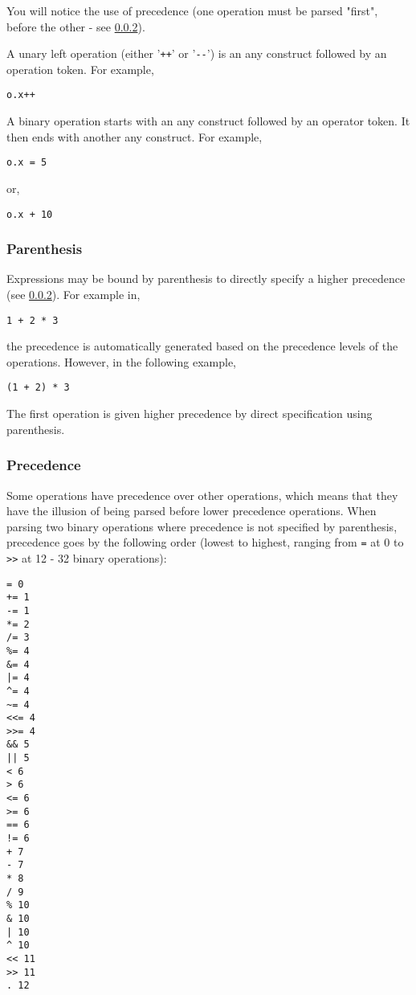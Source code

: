 \documentclass[10pt,a4paper]{article}
\begin{document}
You will notice the use of precedence (one operation must be parsed "first", before the other - see \ref{sec:precedence}).

A unary left operation (either '\verb|++|' or '\verb|--|') is an any construct followed by an operation token. For example,
\begin{verbatim}
o.x++
\end{verbatim}

A binary operation starts with an any construct followed by an operator token. It then ends with another any construct. For example,
\begin{verbatim}
o.x = 5
\end{verbatim}
or,
\begin{verbatim}
o.x + 10
\end{verbatim}

\subsubsection{Parenthesis}
Expressions may be bound by parenthesis to directly specify a higher precedence (see \ref{sec:precedence}). For example in,
\begin{verbatim}
1 + 2 * 3
\end{verbatim}
the precedence is automatically generated based on the precedence levels of the operations. However, in the following example,
\begin{verbatim}
(1 + 2) * 3
\end{verbatim}

The first operation is given higher precedence by direct specification using parenthesis. 

\subsubsection{Precedence}
\label{sec:precedence}
Some operations have precedence over other operations, which means that they have the illusion of being parsed before lower precedence operations. When parsing two binary operations where precedence is not specified by parenthesis, precedence goes by the following order (lowest to highest, ranging from \verb|=| at 0 to \verb|>>| at 12 - 32 binary operations):
\begin{verbatim}
= 0
+= 1
-= 1
*= 2
/= 3
%= 4
&= 4
|= 4
^= 4
~= 4
<<= 4
>>= 4
&& 5
|| 5
< 6
> 6
<= 6
>= 6
== 6
!= 6
+ 7
- 7
* 8
/ 9
% 10
& 10
| 10
^ 10
<< 11
>> 11
. 12
\end{verbatim}
\end{document}
